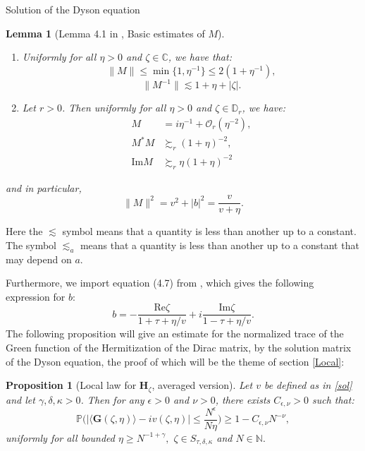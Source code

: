 \documentclass[11pt, a4paper, oneside]{book}
\numberwithin{equation}{chapter}
\newcommand{\beq}{\begin{equation}}
\newcommand{\eeq}{\end{equation}}
\newtheorem{prop}[thm]{Proposition}
\newtheorem{lem}[thm]{Lemma}
\begin{document}
\begin{section}{Solution of the Dyson equation}
\begin{lem} [Lemma 4.1 in \cite{alt2022local}, Basic estimates of $M$]
\begin{enumerate}[label=(\roman*)]
    \item  Uniformly for all $\eta>0$ and $\zeta \in \mathbb{C}$, we have that:
%
\beq \label{est(i)}
\|M\| \leq \min\{1,\eta^{-1}\} \leq 2 (1+\eta^{-1}),
\eeq
%
\beq \label{est(ii)}
\|M^{-1}\| \lesssim 1+ \eta + |\zeta|.
\eeq
%
\item Let $r>0$. Then uniformly for all $\eta>0$ and $\zeta \in \mathbb{D}_r$, we have:
%
\begin{align} \label{est3}
M &= i\eta^{-1} + \mathcal{O}_r(\eta^{-2}), \\
M^* M &\succsim_r (1+\eta)^{-2}, \\
\mathrm{Im} M &\succsim_r \eta (1+\eta)^{-2}
\end{align}
\end{enumerate}
%
and in particular, \beq \|M\|^2 = v^2 + |b|^2 = \frac{v}{v+\eta}.\eeq
\end{lem}
%
Here the $\lesssim$ symbol means that a quantity is less than another up to a constant. The symbol $\lesssim_{a}$ means that a quantity is less than another up to a constant that may depend on $a$.

Furthermore, we import equation (4.7) from \cite{alt2022local}, which gives the following expression for $b$:
\begin{equation}\label{e:b}
b = -\frac{\mathrm{Re} \zeta}{1+ \tau+ \eta/v} + i\frac{\mathrm{Im} \zeta}{1 - \tau + \eta/v}.
\end{equation}
%
The following proposition will give an estimate for the normalized trace of the Green function of the Hermitization of the Dirac matrix, by the solution matrix of the Dyson equation, the proof of which will be the theme of section \ref{Local}:
%
%
\begin{prop}[Local law for $\mathbf{H}_{\zeta}$, averaged version] \label{Local-law1} Let $v$ be defined as in \eqref{sol} and let $\gamma , \delta, \kappa > 0$. Then for any $\epsilon>0$ and $\nu>0$, there exists $C_{\epsilon,\nu}>0$ such that:
%
$$ \mathbb{P} \bigg ( \left | \langle \mathbf{G}(\zeta,\eta) \rangle - i v(\zeta,\eta) \right |  \leq \frac{N^\epsilon}{N\eta} \bigg ) \geq 1 - C_{\epsilon,\nu} N^{-\nu} ,$$
%
uniformly for all bounded $\eta \geq N^{-1+\gamma},$ ${\zeta \in S_{\tau,\delta, \kappa}} $ and $N \in \mathbb{N}.$
\end{prop}
%
\end{section}
\end{document}
